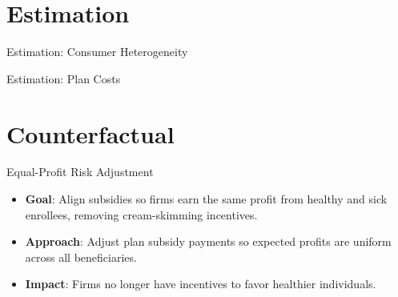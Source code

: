 \documentclass[professionalfonts, aspectratio=169]{beamer}
\begin{document}
\section{Estimation}

\begin{frame}{Estimation: Consumer Heterogeneity}
  
\end{frame}

\begin{frame}{Estimation: Plan Costs}
  
\end{frame}

\section{Counterfactual}

\begin{frame}{Equal-Profit Risk Adjustment}
  \begin{itemize}
    \item \textbf{Goal}: Align subsidies so firms earn the same profit from healthy and sick enrollees, removing cream-skimming incentives.
    \item \textbf{Approach}: Adjust plan subsidy payments so expected profits are uniform across all beneficiaries.
    \item \textbf{Impact}: Firms no longer have incentives to favor healthier individuals. 
  \end{itemize}
\end{frame}
\end{document}
